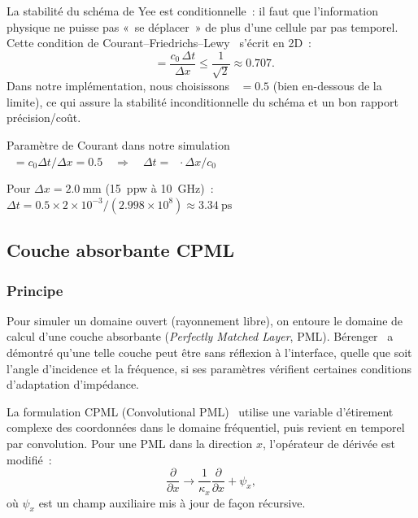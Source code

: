 \documentclass[12pt,a4paper]{article}
\newcommand{\dx}{\Delta x}
\newcommand{\dt}{\Delta t}
\DeclareMathOperator{\Sc}{S_c}
\begin{document}
La stabilité du schéma de Yee est conditionnelle~: il faut que l'information
physique ne puisse pas «~se déplacer~» de plus d'une cellule par pas temporel.
Cette condition de Courant--Friedrichs--Lewy~\cite{Courant1928,Taflove2005} s'écrit
en 2D~:
\begin{equation}
    \Sc = \frac{c_0\,\dt}{\dx} \leq \frac{1}{\sqrt{2}} \approx 0.707.
    \label{eq:cfl}
\end{equation}
Dans notre implémentation, nous choisissons $\Sc = 0.5$ (bien en-dessous de la limite),
ce qui assure la stabilité inconditionnelle du schéma et un bon rapport précision/coût.
\begin{resultbox}{Paramètre de Courant dans notre simulation}
$\Sc = c_0 \dt / \dx = 0.5 \quad \Rightarrow \quad \dt = \Sc \cdot \dx / c_0$

Pour $\dx = \SI{2.0}{\milli\metre}$ (\SI{15}{ppw} à \SI{10}{\giga\hertz})~:
$\dt = 0.5 \times 2 \times 10^{-3} / (2.998 \times 10^8) \approx \SI{3.34}{\pico\second}$
\end{resultbox}

\subsection{Couche absorbante CPML}
\label{ssec:pml}

\subsubsection{Principe}

Pour simuler un domaine ouvert (rayonnement libre), on entoure le domaine de calcul
d'une couche absorbante (\textit{Perfectly Matched Layer}, PML). Bérenger~\cite{Berenger1994}
a démontré qu'une telle couche peut être sans réflexion à l'interface, quelle que
soit l'angle d'incidence et la fréquence, si ses paramètres vérifient certaines
conditions d'adaptation d'impédance.

La formulation CPML (Convolutional PML)~\cite{Roden2000} utilise une variable
d'étirement complexe des coordonnées dans le domaine fréquentiel, puis revient
en temporel par convolution. Pour une PML dans la direction $x$, l'opérateur de
dérivée est modifié~:
\begin{equation}
    \frac{\partial}{\partial x} \longrightarrow \frac{1}{\kappa_x}
    \frac{\partial}{\partial x} + \psi_{x},
    \label{eq:cpml-stretch}
\end{equation}
où $\psi_x$ est un champ auxiliaire mis à jour de façon récursive.
\end{document}
